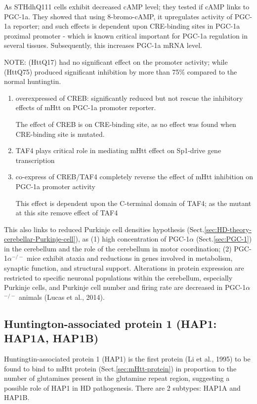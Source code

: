 As STHdhQ111 cells exhibit decreased cAMP level; they tested if cAMP links to
PGC-1a. They showed that using 8-bromo-cAMP, it upregulates activity of
PGC-1a reporter; and such effects is dependent upon CRE-binding sites in
PGC-1a proximal promoter - which is known critical important for PGC-1a
regulation in several tissues. Subsequently, this increases PGC-1a mRNA level.

NOTE: (HttQ17) had no significant effect on the promoter activity; while
(HttQ75) produced significant inhibition by more than 75\% compared to the
normal huntingtin.
\begin{enumerate}
  \item overexpressed of CREB: significantly reduced but not  rescue the
  inhibitory effects of mHtt on PGC-1a promoter reporter.
  
  The effect of CREB is on CRE-binding site, as no effect was found when
  CRE-binding site is mutated.
  
  \item TAF4 plays critical role in mediating mHtt effect on Sp1-drive gene
  transcription 
  
  \item co-express of CREB/TAF4 completely reverse the effect of mHtt inhibition
  on PGC-1a promoter activity
  
  This effect is dependent upon the C-terminal domain of TAF4; as the mutant at
  this site remove effect of TAF4
\end{enumerate}

This also links to reduced Purkinje cell densities hypothesis
(Sect.\ref{sec:HD-theory-cerebellar-Purkinje-cell}), as (1) high concentration
of PGC-1$\alpha$ (Sect.\ref{sec:PGC-1}) in the cerebellum and the role of the
cerebellum in motor coordination; (2) PGC-1$\alpha$$^{-/-}$ mice exhibit ataxia
and reductions in genes involved in metabolism, synaptic function, and
structural support.
Alterations in protein expression are restricted to specific neuronal
populations within the cerebellum, especially Purkinje cells, and Purkinje cell
number and firing rate are decreased in PGC-1$\alpha$$^{-/-}$ animals (Lucas et
al., 2014).


\subsection{Huntington-associated protein 1 (HAP1: HAP1A, HAP1B)}
\label{sec:HAP1}

Huntingtin-associated protein 1 (HAP1) is the first protein  (Li et al., 1995)
to be found to bind to mHtt protein (Sect.\ref{sec:mHtt-protein}) in proportion
to the number of glutamines present in the glutamine repeat region, suggesting a
possible role of HAP1 in HD pathogenesis. There are 2 subtypes: 
HAP1A and HAP1B.


